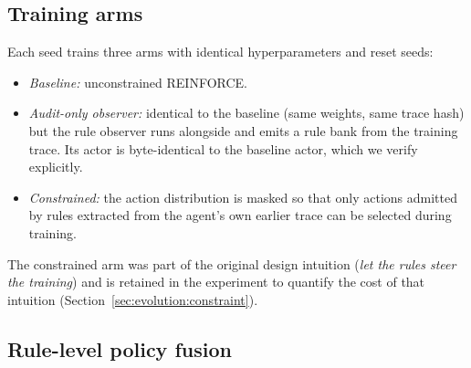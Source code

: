 \documentclass[11pt]{article}
\begin{document}
\subsection{Training arms}
\label{sec:method:arms}

Each seed trains three arms with identical hyperparameters and reset seeds:
\begin{itemize}
  \item \emph{Baseline:} unconstrained REINFORCE.
  \item \emph{Audit-only observer:} identical to the baseline (same weights, same trace hash) but the
        rule observer runs alongside and emits a rule bank from the training trace. Its actor is
        byte-identical to the baseline actor, which we verify explicitly.
  \item \emph{Constrained:} the action distribution is masked so that only actions admitted by rules
        extracted from the agent's own earlier trace can be selected during training.
\end{itemize}
The constrained arm was part of the original design intuition (\emph{let the rules steer the
training}) and is retained in the experiment to quantify the cost of that intuition
(Section~\ref{sec:evolution:constraint}).

\subsection{Rule-level policy fusion}
\label{sec:method:fusion}
\end{document}
